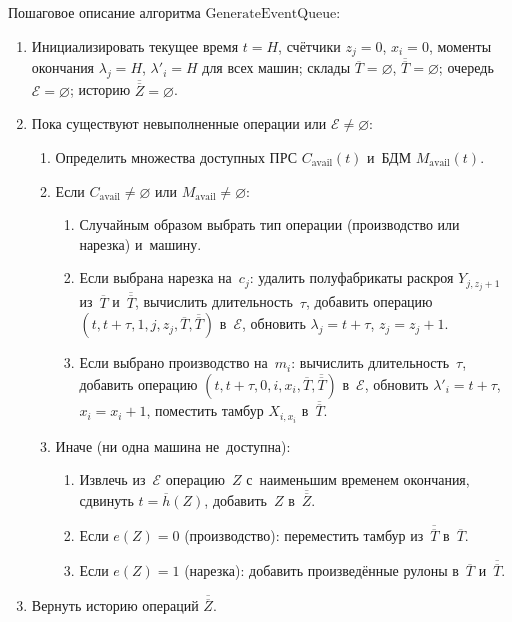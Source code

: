 Пошаговое описание алгоритма $\mathrm{GenerateEventQueue}$:
\begin{enumerate}
  \item Инициализировать текущее время $t=H$, счётчики $z_j=0$, $x_i=0$, моменты окончания $\lambda_j=H$, $\lambda'_i=H$ для всех машин; склады $\overline{T}=\varnothing$, $\overline{\overline{T}}=\varnothing$; очередь $\mathcal{E}=\varnothing$; историю $\overline{\overline{Z}}=\varnothing$.
  \item Пока существуют невыполненные операции или $\mathcal{E}\neq\varnothing$:
  \begin{enumerate}
    \item Определить множества доступных ПРС $C_{\mathrm{avail}}(t)$ и~БДМ $M_{\mathrm{avail}}(t)$.
    \item Если $C_{\mathrm{avail}}\neq\varnothing$ или $M_{\mathrm{avail}}\neq\varnothing$:
    \begin{enumerate}
      \item Случайным образом выбрать тип операции (производство или нарезка) и~машину.
      \item Если выбрана нарезка на~$c_j$: удалить полуфабрикаты раскроя $Y_{j,z_j+1}$ из~$\overline{T}$ и~$\overline{\overline{T}}$, вычислить длительность~$\tau$, добавить операцию $(t,t+\tau,1,j,z_j,\overline{T},\overline{\overline{T}})$ в~$\mathcal{E}$, обновить $\lambda_j=t+\tau$, $z_j=z_j+1$.
      \item Если выбрано производство на~$m_i$: вычислить длительность~$\tau$, добавить операцию $(t,t+\tau,0,i,x_i,\overline{T},\overline{\overline{T}})$ в~$\mathcal{E}$, обновить $\lambda'_i=t+\tau$, $x_i=x_i+1$, поместить тамбур $X_{i,x_i}$ в~$\overline{\overline{T}}$.
    \end{enumerate}
    \item Иначе (ни одна машина не~доступна):
    \begin{enumerate}
      \item Извлечь из~$\mathcal{E}$ операцию~$Z$ с~наименьшим временем окончания, сдвинуть $t=\overline{h}(Z)$, добавить~$Z$ в~$\overline{\overline{Z}}$.
      \item Если $e(Z)=0$ (производство): переместить тамбур из~$\overline{\overline{T}}$ в~$\overline{T}$.
      \item Если $e(Z)=1$ (нарезка): добавить произведённые рулоны в~$\overline{T}$ и~$\overline{\overline{T}}$.
    \end{enumerate}
  \end{enumerate}
  \item Вернуть историю операций $\overline{\overline{Z}}$.
\end{enumerate}

